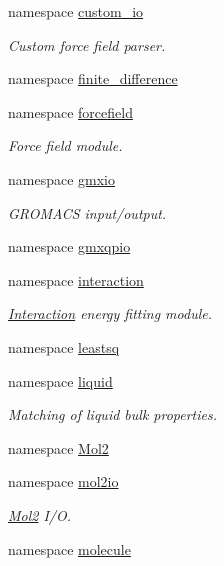 \begin{DoxyCompactItemize}
namespace \hyperlink{namespaceforcebalance_1_1custom__io}{custom\-\_\-io}
\begin{DoxyCompactList}\small\item\em Custom force field parser. \end{DoxyCompactList}\item 
namespace \hyperlink{namespaceforcebalance_1_1finite__difference}{finite\-\_\-difference}
\item 
namespace \hyperlink{namespaceforcebalance_1_1forcefield}{forcefield}
\begin{DoxyCompactList}\small\item\em Force field module. \end{DoxyCompactList}\item 
namespace \hyperlink{namespaceforcebalance_1_1gmxio}{gmxio}
\begin{DoxyCompactList}\small\item\em G\-R\-O\-M\-A\-C\-S input/output. \end{DoxyCompactList}\item 
namespace \hyperlink{namespaceforcebalance_1_1gmxqpio}{gmxqpio}
\item 
namespace \hyperlink{namespaceforcebalance_1_1interaction}{interaction}
\begin{DoxyCompactList}\small\item\em \hyperlink{classforcebalance_1_1interaction_1_1Interaction}{Interaction} energy fitting module. \end{DoxyCompactList}\item 
namespace \hyperlink{namespaceforcebalance_1_1leastsq}{leastsq}
\item 
namespace \hyperlink{namespaceforcebalance_1_1liquid}{liquid}
\begin{DoxyCompactList}\small\item\em Matching of liquid bulk properties. \end{DoxyCompactList}\item 
namespace \hyperlink{namespaceforcebalance_1_1Mol2}{Mol2}
\item 
namespace \hyperlink{namespaceforcebalance_1_1mol2io}{mol2io}
\begin{DoxyCompactList}\small\item\em \hyperlink{namespaceforcebalance_1_1Mol2}{Mol2} I/\-O. \end{DoxyCompactList}\item 
namespace \hyperlink{namespaceforcebalance_1_1molecule}{molecule}
\item 

\end{DoxyCompactItemize}
